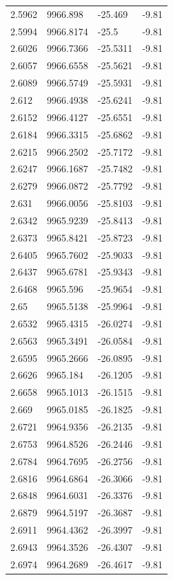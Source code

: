 \begin{table}[H]
\begin{tabular}{llll}
2.5962 & 9966.898 & -25.469 & -9.81 \\
2.5994 & 9966.8174 & -25.5 & -9.81 \\
2.6026 & 9966.7366 & -25.5311 & -9.81 \\
2.6057 & 9966.6558 & -25.5621 & -9.81 \\
2.6089 & 9966.5749 & -25.5931 & -9.81 \\
2.612 & 9966.4938 & -25.6241 & -9.81 \\
2.6152 & 9966.4127 & -25.6551 & -9.81 \\
2.6184 & 9966.3315 & -25.6862 & -9.81 \\
2.6215 & 9966.2502 & -25.7172 & -9.81 \\
2.6247 & 9966.1687 & -25.7482 & -9.81 \\
2.6279 & 9966.0872 & -25.7792 & -9.81 \\
2.631 & 9966.0056 & -25.8103 & -9.81 \\
2.6342 & 9965.9239 & -25.8413 & -9.81 \\
2.6373 & 9965.8421 & -25.8723 & -9.81 \\
2.6405 & 9965.7602 & -25.9033 & -9.81 \\
2.6437 & 9965.6781 & -25.9343 & -9.81 \\
2.6468 & 9965.596 & -25.9654 & -9.81 \\
2.65 & 9965.5138 & -25.9964 & -9.81 \\
2.6532 & 9965.4315 & -26.0274 & -9.81 \\
2.6563 & 9965.3491 & -26.0584 & -9.81 \\
2.6595 & 9965.2666 & -26.0895 & -9.81 \\
2.6626 & 9965.184 & -26.1205 & -9.81 \\
2.6658 & 9965.1013 & -26.1515 & -9.81 \\
2.669 & 9965.0185 & -26.1825 & -9.81 \\
2.6721 & 9964.9356 & -26.2135 & -9.81 \\
2.6753 & 9964.8526 & -26.2446 & -9.81 \\
2.6784 & 9964.7695 & -26.2756 & -9.81 \\
2.6816 & 9964.6864 & -26.3066 & -9.81 \\
2.6848 & 9964.6031 & -26.3376 & -9.81 \\
2.6879 & 9964.5197 & -26.3687 & -9.81 \\
2.6911 & 9964.4362 & -26.3997 & -9.81 \\
2.6943 & 9964.3526 & -26.4307 & -9.81 \\
2.6974 & 9964.2689 & -26.4617 & -9.81 \\

\end{tabular}
\end{table}
